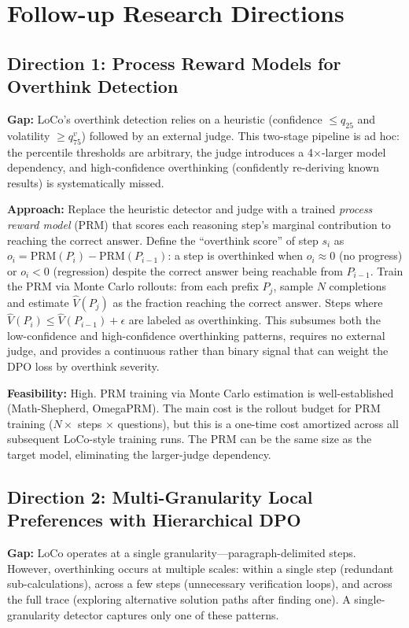 \documentclass[11pt,a4paper]{article}
\begin{document}
\section{Follow-up Research Directions}

\subsection{Direction 1: Process Reward Models for Overthink Detection}
\textbf{Gap:} LoCo's overthink detection relies on a heuristic (confidence $\leq q_{25}$ and volatility $\geq q_{75}^v$) followed by an external judge. This two-stage pipeline is ad hoc: the percentile thresholds are arbitrary, the judge introduces a 4$\times$-larger model dependency, and high-confidence overthinking (confidently re-deriving known results) is systematically missed.

\textbf{Approach:} Replace the heuristic detector and judge with a trained \emph{process reward model} (PRM) that scores each reasoning step's marginal contribution to reaching the correct answer. Define the ``overthink score'' of step $s_i$ as $o_i = \mathrm{PRM}(P_i) - \mathrm{PRM}(P_{i-1})$: a step is overthinked when $o_i \approx 0$ (no progress) or $o_i < 0$ (regression) despite the correct answer being reachable from $P_{i-1}$. Train the PRM via Monte Carlo rollouts: from each prefix $P_j$, sample $N$ completions and estimate $\hat{V}(P_j)$ as the fraction reaching the correct answer. Steps where $\hat{V}(P_i) \leq \hat{V}(P_{i-1}) + \epsilon$ are labeled as overthinking. This subsumes both the low-confidence and high-confidence overthinking patterns, requires no external judge, and provides a continuous rather than binary signal that can weight the DPO loss by overthink severity.

\textbf{Feasibility:} High. PRM training via Monte Carlo estimation is well-established (Math-Shepherd, OmegaPRM). The main cost is the rollout budget for PRM training ($N \times$ steps $\times$ questions), but this is a one-time cost amortized across all subsequent LoCo-style training runs. The PRM can be the same size as the target model, eliminating the larger-judge dependency.

\subsection{Direction 2: Multi-Granularity Local Preferences with Hierarchical DPO}
\textbf{Gap:} LoCo operates at a single granularity---paragraph-delimited steps. However, overthinking occurs at multiple scales: within a single step (redundant sub-calculations), across a few steps (unnecessary verification loops), and across the full trace (exploring alternative solution paths after finding one). A single-granularity detector captures only one of these patterns.
\end{document}
